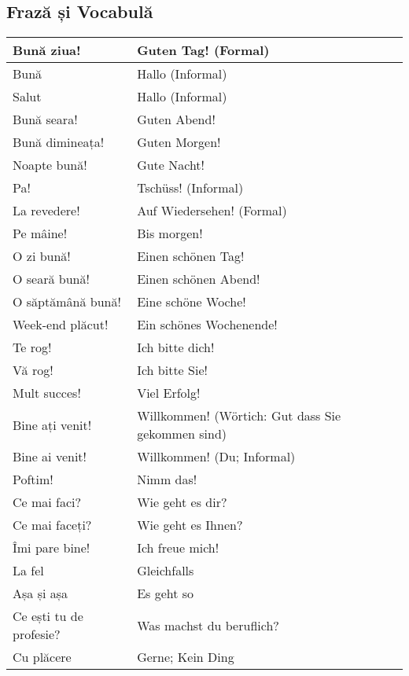 \documentclass[11pt, oneside]{article}
\begin{document}
\subsection{Frază și Vocabulă}
\begin{center}
  \begin{tabular}{ | l | l | } 
    \hline
    Bună ziua! & Guten Tag! (Formal)\\ 
    \hline
    Bună & Hallo (Informal)\\ 
    \hline
    Salut & Hallo (Informal)\\ 
    \hline
    Bună seara! & Guten Abend!\\
    \hline
    Bună dimineața! & Guten Morgen!\\
    \hline
    Noapte bună! & Gute Nacht!\\
    \hline
    Pa! & Tschüss! (Informal)\\
    \hline
    La revedere! & Auf Wiedersehen! (Formal)\\
    \hline
    Pe mâine! & Bis morgen!\\
    \hline
    O zi bună! & Einen schönen Tag!\\
    \hline
    O seară bună! & Einen schönen Abend!\\
    \hline
    O săptămână bună! & Eine schöne Woche!\\
    \hline
    Week-end plăcut! & Ein schönes Wochenende!\\
    \hline
    Te rog! & Ich bitte dich!\\
    \hline
    Vă rog! & Ich bitte Sie!\\
    \hline
    Mult succes! & Viel Erfolg!\\
    \hline
    Bine ați venit! & Willkommen! (Wörtich: Gut dass Sie gekommen sind)\\
    \hline
    Bine ai venit! & Willkommen! (Du; Informal)\\
    \hline
    Poftim! & Nimm das!\\
    \hline
    Ce mai faci? & Wie geht es dir?\\
    \hline
    Ce mai faceți? & Wie geht es Ihnen?\\
    \hline
    Îmi pare bine! & Ich freue mich!\\
    \hline
    La fel & Gleichfalls\\
    \hline
    Așa și așa & Es geht so\\
    \hline 
    Ce ești tu de profesie? & Was machst du beruflich?\\
    \hline
    Cu plăcere & Gerne; Kein Ding\\
    \hline
  \end{tabular}
\end{center}
\pagebreak
%
%
\end{document}
